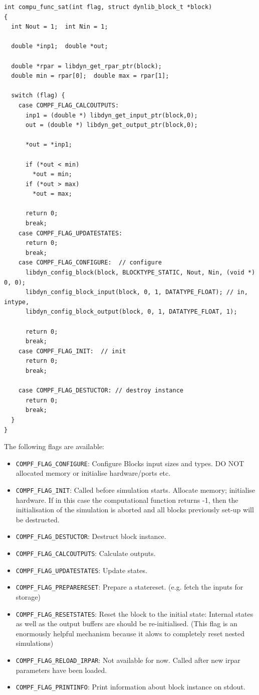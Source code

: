 \documentclass[%
	pdftex,%
	a4paper,%
	oneside,%
	11pt,%
	halfparskip,%
	headsepline,%
	bibtotocnumbered,%
	idxtotoc%
]{scrartcl}
\begin{document}
\begin{verbatim}
int compu_func_sat(int flag, struct dynlib_block_t *block)
{
  int Nout = 1;  int Nin = 1;

  double *inp1;  double *out;	

  double *rpar = libdyn_get_rpar_ptr(block);
  double min = rpar[0];  double max = rpar[1];

  switch (flag) {
    case COMPF_FLAG_CALCOUTPUTS:
      inp1 = (double *) libdyn_get_input_ptr(block,0);
      out = (double *) libdyn_get_output_ptr(block,0);
      
      *out = *inp1;
      
      if (*out < min)
        *out = min;
      if (*out > max)
        *out = max;
      
      return 0;
      break;
    case COMPF_FLAG_UPDATESTATES:
      return 0;
      break;
    case COMPF_FLAG_CONFIGURE:  // configure
      libdyn_config_block(block, BLOCKTYPE_STATIC, Nout, Nin, (void *) 0, 0); 
      libdyn_config_block_input(block, 0, 1, DATATYPE_FLOAT); // in, intype, 
      libdyn_config_block_output(block, 0, 1, DATATYPE_FLOAT, 1);

      return 0;
      break;
    case COMPF_FLAG_INIT:  // init
      return 0;
      break;

    case COMPF_FLAG_DESTUCTOR: // destroy instance
      return 0;
      break;
  }
}
\end{verbatim}


The following flags are available:

\begin{itemize}
 \item \texttt{COMPF\_FLAG\_CONFIGURE}: Configure Blocks input sizes and types. DO NOT allocated memory or initialise hardware/ports etc.
 \item \texttt{COMPF\_FLAG\_INIT}: Called before simulation starts. Allocate memory; initialise hardware. If in this case the computational function returns -1, then the initialisation of the simulation is aborted and all blocks previously set-up will be destructed.
 \item \texttt{COMPF\_FLAG\_DESTUCTOR}: Destruct block instance.
 \item \texttt{COMPF\_FLAG\_CALCOUTPUTS}: Calculate outputs.
 \item \texttt{COMPF\_FLAG\_UPDATESTATES}: Update states.
 \item \texttt{COMPF\_FLAG\_PREPARERESET}: Prepare a statereset. (e.g. fetch the inputs  for storage)
 \item \texttt{COMPF\_FLAG\_RESETSTATES}: Reset the block to the initial state: Internal states as well as the output buffers are should be re-initialised. (This flag is an enormously helpful mechanism because it alows to completely reset nested simulations)
 \item \texttt{COMPF\_FLAG\_RELOAD\_IRPAR}: Not available for now. Called after new irpar parameters have been loaded.
 \item \texttt{COMPF\_FLAG\_PRINTINFO}: Print information about block instance on stdout.
\end{itemize}
\end{document}
